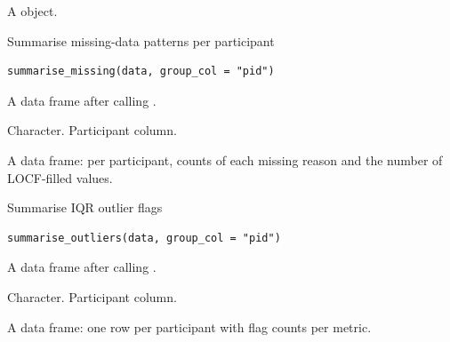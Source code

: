 \documentclass[a4paper]{book}
\begin{document}
%
\begin{Value}
A  object.
\end{Value}
%
\begin{Description}
Summarise missing-data patterns per participant
\end{Description}
%
\begin{Usage}
\begin{verbatim}
summarise_missing(data, group_col = "pid")
\end{verbatim}
\end{Usage}
%
\begin{Arguments}
\begin{ldescription}
\item[\code{data}] A data frame after calling .

\item[\code{group\_col}] Character. Participant column.
\end{ldescription}
\end{Arguments}
%
\begin{Value}
A data frame: per participant, counts of each missing reason
and the number of LOCF-filled values.
\end{Value}
%
\begin{Description}
Summarise IQR outlier flags
\end{Description}
%
\begin{Usage}
\begin{verbatim}
summarise_outliers(data, group_col = "pid")
\end{verbatim}
\end{Usage}
%
\begin{Arguments}
\begin{ldescription}
\item[\code{data}] A data frame after calling .

\item[\code{group\_col}] Character. Participant column.
\end{ldescription}
\end{Arguments}
%
\begin{Value}
A data frame: one row per participant with flag counts per metric.
\end{Value}
\end{document}

